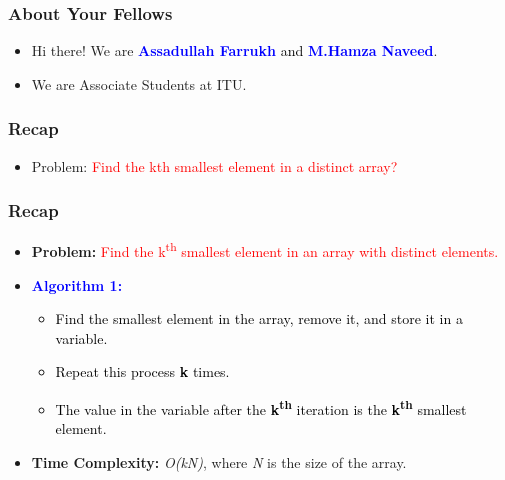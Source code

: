 \setmainfont{Noteworthy}
\begin{frame}
    \frametitle{About Your Fellows}
    \begin{itemize}
        \item Hi there! We are \textcolor{blue}{\textbf{ Assadullah Farrukh}  \textcolor{black}{and}\textbf{ M.Hamza Naveed}}.
        \item We are Associate Students at ITU.
    \end{itemize}
\end{frame}




\begin{frame}
    \frametitle{Recap}
    \begin{itemize}
        \item Problem: \textcolor{red}{Find the kth smallest element in a distinct array?}
    \end{itemize}
\end{frame}

\begin{frame}
    \frametitle{Recap}
    \vspace{0.3cm} %
    \begin{itemize}
        \item \textbf{Problem:} \textcolor{red}{Find the k\textsuperscript{th} smallest element in an array with distinct elements.}
        \vspace{0.3cm} %
        \item \textcolor{blue}{\textbf{Algorithm 1:}}
        \vspace{0.2cm} %
        \begin{itemize}
            \item \textcolor{black}{Find the smallest  element in the array, remove it, and store it in a variable.}
            \item \textcolor{black}{Repeat this process \textbf{k} times.}
            \item \textcolor{black}{The value in the variable after the \textbf{k\textsuperscript{th}} iteration is the \textbf{k\textsuperscript{th}} smallest element.}
        \end{itemize}
         \item \textbf{Time Complexity:} \textit{O(kN)}, where \textit{N} is the size of the array.
    \end{itemize}
    \vspace{0.5cm} %
\end{frame}

